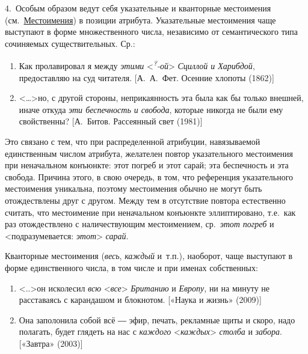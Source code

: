 4.~Особым образом ведут себя указательные и кванторные местоимения
(см.~\underline{Местоимения}) в позиции атрибута. Указательные
местоимения чаще выступают в форме множественного числа, независимо от
семантического типа сочиняемых существительных. Ср.:

\begin{enumerate}
  \def\labelenumi{(\arabic{enumi})}
  \setcounter{enumi}{133}
  \item
        Как пролавировал я между \textit{этими}
        \textless{}\textit{\textsuperscript{?}-ой}\textgreater{} \textit{Сциллой и
          Харибдой}, предоставляю на суд читателя. {[}А.~А.~Фет. Осенние хлопоты
        (1862){]}
  \item
        \textless\ldots\textgreater но, с другой стороны, неприкаянность эта
        была как бы только внешней, иначе откуда \textit{эти беспечность и
          свобода}, которые никогда не были ему свойственны? {[}А.~Битов.
        Рассеянный свет (1981){]}
\end{enumerate}

Это связано с тем, что при распределенной атрибуции, навязываемой
единственным числом атрибута, желателен повтор указательного местоимения
при неначальном конъюнкте: этот погреб и этот сарай; эта беспечность и
эта свобода. Причина этого, в свою очередь, в том, что референция
указательного местоимения уникальна, поэтому местоимения обычно не могут
быть отождествлены друг с другом. Между тем в отсутствие повтора
естественно считать, что местоимение при неначальном конъюнкте
эллиптировано, т.е.~как раз отождествлено с наличествующим местоимением,
ср.~\textit{этот погреб} и \textless подразумевается:
\textit{этот}\textgreater{} \textit{сарай}.

Кванторные местоимения (\textit{весь}, \textit{каждый} и~т.п.), наоборот,
чаще выступают в форме единственного числа, в том числе и при именах
собственных:

\begin{enumerate}
  \def\labelenumi{(\arabic{enumi})}
  \setcounter{enumi}{135}
  \item
        \textless..\textgreater он исколесил \textit{всю}
        \textless*\textit{все}\textgreater{} \textit{Британию} и \textit{Европу}, ни
        на минуту не расставаясь с карандашом и блокнотом. {[}«Наука и жизнь»
        (2009){]}
  \item
        Она заполонила собой всё ― эфир, печать, рекламные щиты и скоро, надо
        полагать, будет глядеть на нас с \textit{каждого}
        \textless*\textit{каждых}\textgreater{} \textit{столба} и \textit{забора}.
        {[}«Завтра» (2003){]}
\end{enumerate}

